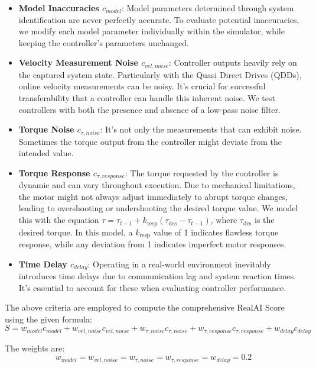 \begin{itemize}
    \item \textbf{Model Inaccuracies \(c_{model}\)}: Model parameters determined through system identification are never perfectly accurate. To evaluate potential inaccuracies, we modify each model parameter individually within the simulator, while keeping the controller's parameters unchanged.

    \item \textbf{Velocity Measurement Noise \(c_{vel, noise}\)}: Controller outputs heavily rely on the captured system state. Particularly with the Quasi Direct Drives (QDDs), online velocity measurements can be noisy. It's crucial for successful transferability that a controller can handle this inherent noise. We test controllers with both the presence and absence of a low-pass noise filter.

    \item \textbf{Torque Noise \(c_{\tau,noise}\)}: It's not only the measurements that can exhibit noise. Sometimes the torque output from the controller might deviate from the intended value.

    \item \textbf{Torque Response \(c_{\tau,response}\)}: The torque requested by the controller is dynamic and can vary throughout execution. Due to mechanical limitations, the motor might not always adjust immediately to abrupt torque changes, leading to overshooting or undershooting the desired torque value. We model this with the equation \(\tau = \tau_{t-1} + k_{\text{resp}} (\tau_{\text{des}} - \tau_{t-1})\), where \(\tau_{\text{des}}\) is the desired torque. In this model, a \(k_{\text{resp}}\) value of 1 indicates flawless torque response, while any deviation from 1 indicates imperfect motor responses.

    \item \textbf{Time Delay \(c_{delay}\)}: Operating in a real-world environment inevitably introduces time delays due to communication lag and system reaction times. It's essential to account for these when evaluating controller performance.
\end{itemize}

The above criteria are employed to compute the comprehensive RealAI Score using the given formula:
\begin{equation}
 S = w_{model} c_{model} + 
    w_{vel, noise} c_{vel, noise} +  
    w_{\tau, noise} c_{\tau, noise} +  
    w_{\tau, response} c_{\tau, response} +  
    w_{delay} c_{delay}
\end{equation}

The weights are:
\begin{equation}
 w_{model} = w_{vel, noise} = w_{\tau, noise} = w_{\tau, response} = w_{delay} = 0.2
\end{equation}
\cleardoublepage
